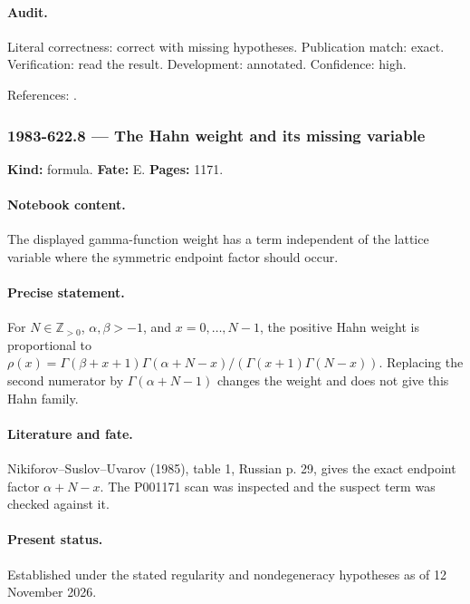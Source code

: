 \paragraph{Audit.} Literal correctness: correct with missing hypotheses. Publication match: exact. Verification: read the result. Development: annotated. Confidence: high.

\noindent References: \citep{nikiforovsuslovuvarov1985rotation,nikiforovsuslovuvarov1991classical}.\par

\subsubsection{1983-622.8 --- The Hahn weight and its missing variable}

\label{item:1983-622.8}

\noindent\textbf{Kind:} formula. \textbf{Fate:} E. \textbf{Pages:} 1171.\par

\paragraph{Notebook content.} The displayed gamma-function weight has a term independent of the lattice variable where the symmetric endpoint factor should occur.

\paragraph{Precise statement.} For \(N\in\mathbb Z_{>0}\), \(\alpha,\beta>-1\), and \(x=0,\ldots,N-1\), the positive Hahn weight is proportional to \(\rho(x)=\Gamma(\beta+x+1)\Gamma(\alpha+N-x)/(\Gamma(x+1)\Gamma(N-x))\). Replacing the second numerator by \(\Gamma(\alpha+N-1)\) changes the weight and does not give this Hahn family.

\paragraph{Literature and fate.} Nikiforov–Suslov–Uvarov (1985), table 1, Russian p. 29, gives the exact endpoint factor \(\alpha+N-x\). The P001171 scan was inspected and the suspect term was checked against it.

\paragraph{Present status.} Established under the stated regularity and nondegeneracy hypotheses as of 12 November 2026.

